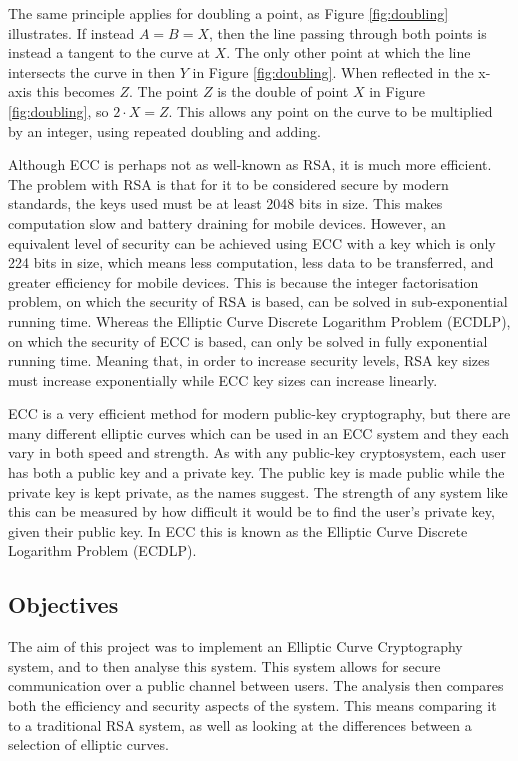 \documentclass[12pt,a4paper]{article}
\begin{document}
The same principle applies for doubling a point, as Figure \ref{fig:doubling} illustrates. 
If instead $A = B = X$, then the line passing through both points is instead a tangent to the curve at $X$. 
The only other point at which the line intersects the curve in then $Y$ in Figure \ref{fig:doubling}. 
When reflected in the x-axis this becomes $Z$. 
The point $Z$ is the double of point $X$ in Figure \ref{fig:doubling}, so $2 \cdot X = Z$. 
This allows any point on the curve to be multiplied by an integer, using repeated doubling and adding. 

\vspace{2mm}

Although ECC is perhaps not as well-known as RSA, it is much more efficient. 
The problem with RSA is that for it to be considered secure by modern standards, the keys used must be at least 2048 bits in size. 
This makes computation slow and battery draining for mobile devices. 
However, an equivalent level of security can be achieved using ECC with a key which is only 224 bits in size, 
which means less computation, less data to be transferred, and greater efficiency for mobile devices. 
This is because the integer factorisation problem, on which the security of RSA is based, can be solved in sub-exponential running time. 
Whereas the Elliptic Curve Discrete Logarithm Problem (ECDLP), on which the security of ECC is based, can only be solved in fully exponential running time. 
Meaning that, in order to increase security levels, RSA key sizes must increase exponentially while ECC key sizes can increase linearly. 

ECC is a very efficient method for modern public-key cryptography, 
but there are many different elliptic curves which can be used in an ECC system and they each vary in both speed and strength. 
As with any public-key cryptosystem, each user has both a public key and a private key. 
The public key is made public while the private key is kept private, as the names suggest. 
The strength of any system like this can be measured by how difficult it would be to find the user's private key, given their public key. 
In ECC this is known as the Elliptic Curve Discrete Logarithm Problem (ECDLP). 


\subsection{Objectives} \noindent
The aim of this project was to implement an Elliptic Curve Cryptography system, 
and to then analyse this system. 
This system allows for secure communication over a public channel between users. 
The analysis then compares both the efficiency and security aspects of the system. 
This means comparing it to a traditional RSA system, 
as well as looking at the differences between a selection of elliptic curves. 
\end{document}
